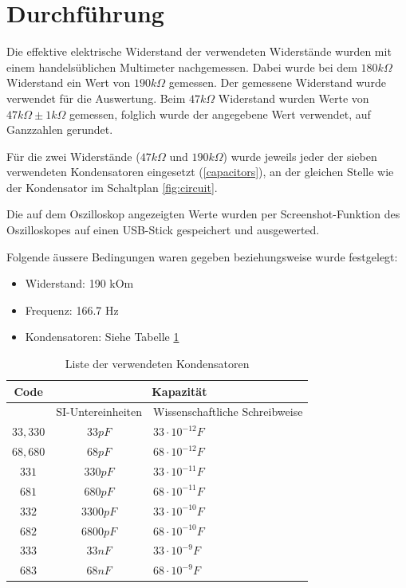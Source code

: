 \documentclass{article}
\begin{document}
\section{Durchführung}

Die effektive elektrische Widerstand der verwendeten Widerstände wurden mit einem handelsüblichen Multimeter nachgemessen. Dabei wurde bei dem $180k\Omega$ Widerstand ein Wert von $190k\Omega$ gemessen. Der gemessene Widerstand wurde verwendet für die Auswertung. Beim $47k\Omega$ Widerstand wurden Werte von $47k\Omega \pm 1k\Omega$ gemessen, folglich wurde der angegebene Wert verwendet, auf Ganzzahlen gerundet.

Für die zwei Widerstände ($47k\Omega$ und $190k\Omega$) wurde jeweils jeder der sieben verwendeten Kondensatoren eingesetzt (\ref{capacitors}), an der gleichen Stelle wie der Kondensator im Schaltplan \ref{fig:circuit}.

Die auf dem Oszilloskop angezeigten Werte wurden per Screenshot-Funktion des Oszilloskopes auf einen USB-Stick gespeichert und ausgewerted. 

Folgende äussere Bedingungen waren gegeben beziehungsweise wurde festgelegt:
\begin{itemize}
    \item Widerstand: 190 kOm
    \item Frequenz: 166.7 Hz
    \item Kondensatoren: Siehe Tabelle \ref{tab:capacitors}
\end{itemize}

\begin{table}[ht]
    \centering
    \begin{tabular}{c|c|p{2.5cm}}
         Code       & \multicolumn{2}{c}{Kapazität} \\
         \hline\hline
                    & SI-Untereinheiten & Wissenschaftliche Schreibweise \\
         \hline
         $33, 330$  & $33p F$   & $33 \cdot 10^{-12} F$ \\
         $68, 680$  & $68p F$   & $68 \cdot 10^{-12} F$ \\
         $331$      & $330p F$  & $33 \cdot 10^{-11} F$ \\
         $681$      & $680p F$  & $68 \cdot 10^{-11} F$ \\
         $332$      & $3300p F$ & $33 \cdot 10^{-10} F$ \\
         $682$      & $6800p F$ & $68 \cdot 10^{-10} F$ \\
         $333$      & $33n F$   & $33 \cdot 10^{-9} F$ \\
         $683$      & $68n F$   & $68 \cdot 10^{-9} F$ \\
    \end{tabular}
    \caption{Liste der verwendeten Kondensatoren}
    \label{tab:capacitors}
\end{table}
\end{document}

